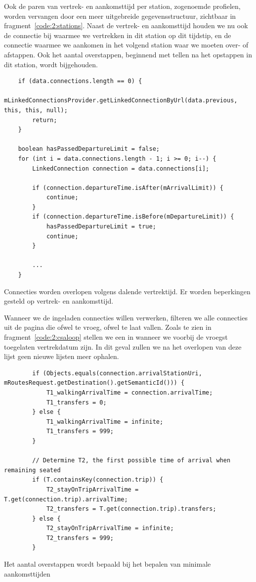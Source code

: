 Ook de paren van vertrek- en aankomsttijd per station, zogenoemde profielen, worden vervangen door een meer uitgebreide gegevensstructuur, zichtbaar in fragment~\ref{code:2:stations}. Naast de vertrek- en aankomsttijd houden we nu ook de connectie bij waarmee we vertrekken in dit station op dit tijdstip, en de connectie waarmee we aankomen in het volgend station waar we moeten over- of afstappen. Ook het aantal overstappen, beginnend met tellen na het opstappen in dit station, wordt bijgehouden.

\begin{listing}[htb]
\begin{verbatim}
	if (data.connections.length == 0) {
		mLinkedConnectionsProvider.getLinkedConnectionByUrl(data.previous, this, this, null);
		return;
	}
	
	boolean hasPassedDepartureLimit = false;
	for (int i = data.connections.length - 1; i >= 0; i--) {
		LinkedConnection connection = data.connections[i];
		
		if (connection.departureTime.isAfter(mArrivalLimit)) {
			continue;
		}
		if (connection.departureTime.isBefore(mDepartureLimit)) {
			hasPassedDepartureLimit = true;
			continue;
		}
		
		...
	}
	\end{verbatim}
			\caption[CSA: Overlopen van connecties]{Connecties worden overlopen volgens dalende vertrektijd. Er worden beperkingen gesteld op vertrek- en aankomsttijd.}
	\label{code:2:csaloop}
\end{listing}

Wanneer we de ingeladen connecties willen verwerken, filteren we alle connecties uit de pagina die ofwel te vroeg, ofwel te laat vallen. Zoals te zien in fragment~\ref{code:2:csaloop} stellen we een  in wanneer we voorbij de vroegst toegelaten vertrekdatum zijn. In dit geval zullen we na het overlopen van deze lijst geen nieuwe lijsten meer ophalen. 

\begin{listing}[htb]
	\begin{verbatim}
	 	if (Objects.equals(connection.arrivalStationUri, mRoutesRequest.getDestination().getSemanticId())) {
			T1_walkingArrivalTime = connection.arrivalTime;
			T1_transfers = 0;
		} else {
			T1_walkingArrivalTime = infinite;
			T1_transfers = 999;
		}

		// Determine T2, the first possible time of arrival when remaining seated
		if (T.containsKey(connection.trip)) {
			T2_stayOnTripArrivalTime = T.get(connection.trip).arrivalTime;
			T2_transfers = T.get(connection.trip).transfers;
		} else {
			T2_stayOnTripArrivalTime = infinite;
			T2_transfers = 999;
		}	
		\end{verbatim}
					\caption[CSA: Bepalen van aankomsttijden]{Het aantal overstappen wordt bepaald bij het bepalen van minimale aankomsttijden}
		\label{code:2:csaT1T2}
\end{listing}

